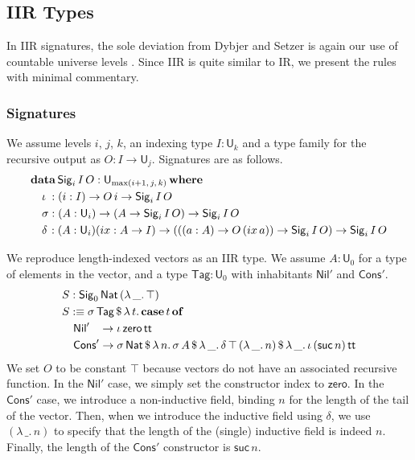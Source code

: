 \documentclass[acmsmall,screen,review,anonymous]{acmart}
\newcommand{\msf}[1]{{\mathsf{#1}}}
\newcommand{\mbf}[1]{{\mathbf{#1}}}
\newcommand{\data}{\mbf{data}}
\newcommand{\U}{\msf{U}}
\newcommand{\where}{\mbf{where}}
\newcommand{\Nat}{\msf{Nat}}
\newcommand{\zero}{\msf{zero}}
\newcommand{\suc}{\msf{suc}}
\newcommand{\Nil}{\msf{Nil}}
\newcommand{\Cons}{\msf{Cons}}
\newcommand{\Sig}{\msf{Sig}}
\newcommand{\Tag}{\msf{Tag}}
\newcommand{\case}{\mbf{case}}
\newcommand{\of}{\mbf{of}}
\newcommand{\ttt}{\msf{tt}}
\newcommand{\ix}{{ix}}
\begin{document}
\subsection{IIR Types}\label{sec:iir}

In IIR signatures, the sole deviation from Dybjer and Setzer is again our use of countable universe
levels \cite{DBLP:journals/jlp/DybjerS06}. Since IIR is quite similar to IR, we present the rules with
minimal commentary.

\subsubsection{Signatures}\label{sec:iir-signatures} We assume levels $i$, $j$, $k$, an indexing type $I : \U_k$ and a type family
for the recursive output as $O : I \to \U_j$. Signatures are as follows.
\begin{alignat*}{4}
  &\data\, \Sig_i\,I\,O : \U_{\max(i+1,\,j,\,k)}\,\where\\
  &\quad \iota\hspace{0.25em}  : (i : I) \to O\,i \to \Sig_i\,I\,O \\
  &\quad \sigma                : (A : \U_i) \to (A \to \Sig_i\,I\,O) \to \Sig_i\,I\,O \\
  &\quad \delta\hspace{0.1em}  : (A : \U_i)(\ix : A \to I) \to (((a : A) \to O\,(\ix\,a)) \to \Sig_i\,I\,O) \to \Sig_i\,I\,O
\end{alignat*}

\begin{example}\label{ex:vector} We reproduce length-indexed vectors as an IIR type. We assume $A : \U_0$ for a type of elements in the vector,
and a type $\Tag : \U_0$ with inhabitants $\Nil'$ and $\Cons'$.
\begin{alignat*}{4}
  & S : \Sig_0\,\Nat\,(\lambda\,\_.\,\top)\\
  & S :\equiv \sigma\,\Tag\,\$\,\lambda\,t.\,\case\,t\,\of \\
  & \quad \Nil'\hspace{0.85em} \to \iota\,\zero\,\ttt \\
  & \quad \Cons'\to \sigma\,\Nat\,\$\,\lambda\,n.\,\sigma\,A\,\$\,\lambda\,\_.\,\delta\,\top\,(\lambda\,\_.\,n)\,\$\,\lambda\,\_.\,\iota\,(\suc\,n)\,\ttt
\end{alignat*}
We set $O$ to be constant $\top$ because vectors do not have an associated recursive function. In
the $\Nil'$ case, we simply set the constructor index to $\zero$. In the $\Cons'$ case, we introduce
a non-inductive field, binding $n$ for the length of the tail of the vector. Then, when we introduce
the inductive field using $\delta$, we use $(\lambda\,\_.\,n)$ to specify that the length of the
(single) inductive field is indeed $n$. Finally, the length of the $\Cons'$ constructor is $\suc\,n$.
\end{example}
\end{document}
